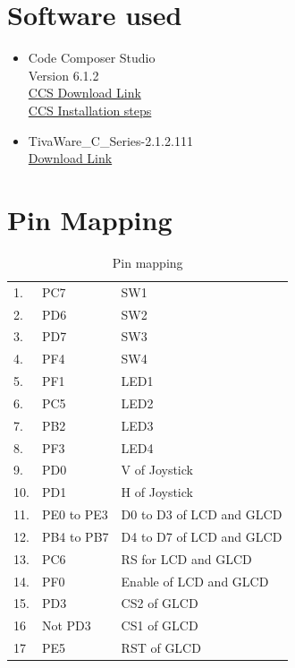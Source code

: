 \documentclass[a4paper,12pt,oneside]{book}
\begin{document}
\section{Software used}
\begin{itemize}
  \item Code Composer Studio\\  
  Version 6.1.2 \\
  \href{http://processors.wiki.ti.com/index.php/Download_CCS}{CCS Download Link}\\
  \href{http://processors.wiki.ti.com/index.php/GSG:CCSv6_installation}{CCS Installation steps}
  \item TivaWare\_C\_Series-2.1.2.111\\
  \href{http://www.ti.com/tool/sw-tm4c}{Download Link}
\end{itemize}
\newpage
\section{Pin Mapping}

\begin{table}[]
\centering
\begin{tabular}{lll}
1.  & PC7        & SW1                      \\
2.  & PD6        & SW2                      \\
3.  & PD7        & SW3                      \\
4.  & PF4        & SW4                      \\
5.  & PF1        & LED1                     \\
6.  & PC5        & LED2                     \\
7.  & PB2        & LED3                     \\
8.  & PF3        & LED4                     \\
9.  & PD0        & V of Joystick            \\
10. & PD1        & H of Joystick            \\
11. & PE0 to PE3 & D0 to D3 of LCD and GLCD \\
12. & PB4 to PB7 & D4 to D7 of LCD and GLCD \\
13. & PC6        & RS for LCD and GLCD      \\
14. & PF0        & Enable of LCD and GLCD   \\
15. & PD3        & CS2 of  GLCD             \\
16  & Not PD3    & CS1 of GLCD              \\
17  & PE5        & RST of GLCD             
\end{tabular}
\caption{Pin mapping}
\end{table}
\end{document}
